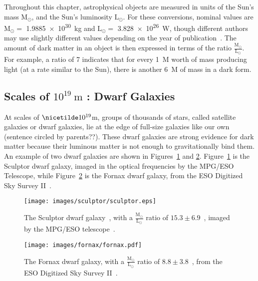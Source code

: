 Throughout this chapter, astrophysical objects are measured in units of the Sun's mass $\textrm{M}_\odot$, and the Sun's luminosity $\textrm{L}_\odot$.
For these conversions, nominal values are $\textrm{M}_\odot =$ \SI{1.9885e30}{kg} and $\textrm{L}_\odot =$ \SI{3.828e26}{W}, though different authors may use slightly different values depending on the year of publication~\cite{iau_solarconstants}.
The amount of dark matter in an object is then expressed in terms of the ratio $\frac{\textrm{M}_\odot}{\textrm{L}_\odot}$.
For example, a ratio of \SI{7}{} indicates that for every \SI{1}{M_\odot} worth of mass producing light (at a rate similar to the Sun), there is another \SI{6}{M_\odot} of mass in a dark form.
  
\subsection{Scales of $10^{19}\:\text{m}$ : Dwarf Galaxies}\label{dm_dwarfscale}
At scales of $\nicetilde 10^{19}$m, groups of thousands of stars, called satellite galaxies or dwarf galaxies, lie at the edge of full-size galaxies like our own {\color{red}(sentence circled by parents??)}.
These dwarf galaxies are strong evidence for dark matter because their luminous matter is not enough to gravitationally bind them.
An example of two dwarf galaxies are shown in Figures~\ref{fig:sculptor} and \ref{fig:fornax}.
Figure~\ref{fig:sculptor} is the Sculptor dwarf galaxy, imaged in the optical frequencies by the MPG/ESO Telescope, while Figure~\ref{fig:fornax} is the Fornax dwarf galaxy, from the ESO Digitized Sky Survey II~\cite{fornax_image}.

\begin{figure}[!ht]
  \centering
  \texttt{[image: images/sculptor/sculptor.eps]}
  \caption[Sculptor Dwarf Galaxy]{
    The Sculptor dwarf galaxy~\cite{sculptor_image}, with a $\frac{\textrm{M}_\odot}{\textrm{L}_\odot}$ ratio of $15.3\pm6.9$~\cite{sculptor_ml}, imaged by the MPG/ESO telescope~\cite{sculptor_paper}.
  }
  \label{fig:sculptor}
\end{figure}

\begin{figure}[!ht]
  \centering
  \texttt{[image: images/fornax/fornax.pdf]}
  \caption[Fornax Dwarf Galaxy]{
    The Fornax dwarf galaxy, with a $\frac{\textrm{M}_\odot}{\textrm{L}_\odot}$ ratio of $8.8\pm3.8$~\cite{sculptor_ml}, from the ESO Digitized Sky Survey II~\cite{fornax_image}.
  }
  \label{fig:fornax}
\end{figure}

